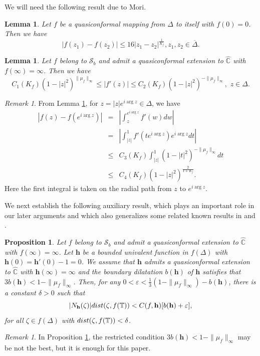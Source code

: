 \documentclass[11pt]{amsart}
\newtheorem{lemma}[theorem]{Lemma}
\newtheorem{proposition}[theorem]{Proposition}
\theoremstyle{remark}
\newtheorem{remark}[theorem]{Remark}
\theoremstyle{claim}
\theoremstyle{definition}
\theoremstyle{problem}
\theoremstyle{conjecture}
\theoremstyle{question}
\numberwithin{equation}{section}
\begin{document}
We will need the following result due to Mori.
\begin{lemma}\label{l4}
Let $f$ be a quasiconformal mapping from $\Delta$ to itself with $f(0)=0$.  Then we have
$$|f(z_1)-f(z_2)|\leq 16 |z_1-z_2|^{\frac{1}{K_f}}, z_1, z_2\in \overline{\Delta}.$$
\end{lemma}

\begin{lemma}\label{l5}
Let $f$ belong to $\mathcal{S}_b$ and admit a quasiconformal extension to $\widehat{\mathbb{C}}$ with $f(\infty)=\infty$.  Then we have
$$C_1(K_f)(1-|z|^2)^{\|\mu_f\|_{\infty}}\leq  |f'(z)|\leq C_2(K_f) (1-|z|^2)^{-\|\mu_f\|_{\infty}}, \,\, z\in \Delta.$$
\end{lemma}

\begin{remark}\label{remark}
From Lemma \ref{l5}, for $z=|z|e^{i\arg z} \in \Delta$, we have
\begin{eqnarray}
|f(z)-f(e^{i \arg z})| &=& |\int_{z}^{e^{i \arg z}} f'(w)dw|  \nonumber \\
&=& |\int_{|z|}^1 f'(t e^{i \arg z})e^{i\arg z}dt| \nonumber  \\
& \leq & C_3(K_f) \int_{|z|}^1 (1-|t|^2)^{-\|\mu_f\|_{\infty}} dt \nonumber \\
&\leq & C_4(K_f) (1-|z|^2)^{\frac{2}{1+K_f}}. \nonumber
\end{eqnarray}
Here the first integral is taken on the radial path from $z$ to $e^{i\arg z}$.
\end{remark}

We next establish the following auxiliary result, which plays an important role in our later arguments and which also generalizes some related known results in \cite{BP} and \cite{Dyn}.
\begin{proposition}\label{key}
Let $f$ belong to $\mathcal{S}_b$ and admit a quasiconformal extension to $\widehat{\mathbb{C}}$ with $f(\infty)=\infty$. Let $\mathbf{h}$ be a bounded univalent function in $f(\Delta)$ with $\mathbf{h}(0)=\mathbf{h}'(0)-1=0$. We assume that $\mathbf{h}$ admits a quasiconformal extension to $\widehat{\mathbb{C}}$ with $\mathbf{h}(\infty)=\infty$ and the boundary dilatation $b(\mathbf{h})$ of $\mathbf{h}$ satisfies that  $3b(\mathbf{h})<1-\|\mu_f\|_{\infty}$.  Then, for any $0<\varepsilon <\frac{1}{3}(1-\|\mu_f\|_{\infty})-b(\mathbf{h})$, there is a constant $\delta>0$ such that
$$ |N_{\mathbf{h}}(\zeta)|{\textup{dist}}(\zeta, f(\mathbb{T}))<C(f, \mathbf{h})[ b(\mathbf{h})+\varepsilon],$$
for all  $\zeta\in f(\Delta)$ with ${\textup{dist}}(\zeta, f(\mathbb{T}))<\delta$.
\end{proposition}
\begin{remark}
In Proposition \ref{key}, the restricted condition $3b(\mathbf{h})<1-\|\mu_f\|_{\infty}$ may be not the best, but it is enough for this paper.
\end{remark}
\end{document}
